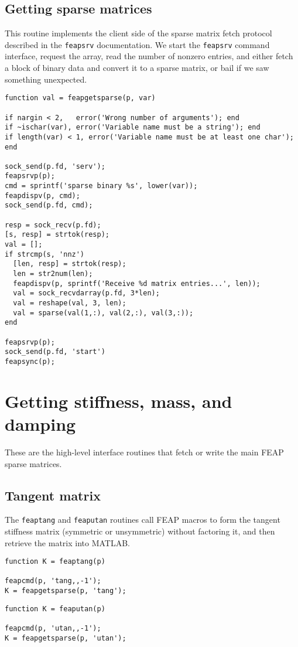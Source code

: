 \subsection{Getting sparse matrices}

This routine implements the client side of the sparse matrix fetch
protocol described in the {\tt feapsrv} documentation.  We start
the {\tt feapsrv} command interface, request the array, read the
number of nonzero entries, and either fetch a block of binary
data and convert it to a sparse matrix, or bail if we saw
something unexpected.

\begin{verbatim}
function val = feapgetsparse(p, var)

if nargin < 2,   error('Wrong number of arguments'); end
if ~ischar(var), error('Variable name must be a string'); end
if length(var) < 1, error('Variable name must be at least one char'); end

sock_send(p.fd, 'serv');
feapsrvp(p);
cmd = sprintf('sparse binary %s', lower(var));
feapdispv(p, cmd);
sock_send(p.fd, cmd);

resp = sock_recv(p.fd);
[s, resp] = strtok(resp);
val = [];
if strcmp(s, 'nnz')
  [len, resp] = strtok(resp);
  len = str2num(len);
  feapdispv(p, sprintf('Receive %d matrix entries...', len));
  val = sock_recvdarray(p.fd, 3*len);
  val = reshape(val, 3, len);
  val = sparse(val(1,:), val(2,:), val(3,:));
end

feapsrvp(p);
sock_send(p.fd, 'start')
feapsync(p);
\end{verbatim}
\section {Getting stiffness, mass, and damping}

These are the high-level interface routines that fetch or write
the main FEAP sparse matrices.

\subsection{Tangent matrix}

The {\tt feaptang} and {\tt feaputan} routines call FEAP macros
to form the tangent stiffness matrix (symmetric or unsymmetric)
without factoring it, and then retrieve the matrix into MATLAB.

\begin{verbatim}
function K = feaptang(p)

feapcmd(p, 'tang,,-1');
K = feapgetsparse(p, 'tang');
\end{verbatim}
\begin{verbatim}
function K = feaputan(p)

feapcmd(p, 'utan,,-1');
K = feapgetsparse(p, 'utan');
\end{verbatim}
